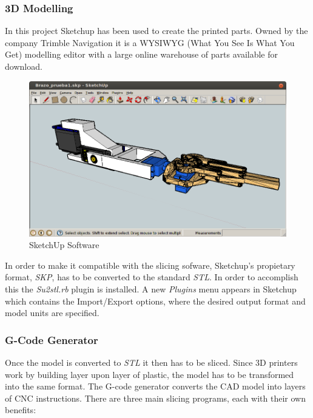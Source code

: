 	\subsubsection{3D Modelling }
	In this project Sketchup has been used to create the printed parts. Owned by the company Trimble Navigation it is a WYSIWYG (What You See Is What You Get) modelling editor with a large online warehouse of parts available for download. \\

		\begin{figure}[H]
			\centering
			\includegraphics[scale=0.4]{images/sketchup-arm.png}
			\caption{SketchUp Software}
			\label{}
		\end{figure}
		\bigskip

	In order to make it compatible with the slicing sofware, Sketchup's propietary format, \textit{SKP}, has to be converted to the standard \textit{STL}. In order to accomplish this the \textit{Su2stl.rb} plugin is installed. A new \textit{Plugins} menu appears in Sketchup which contains the Import/Export options, where the desired output format and model units are specified.



	\subsubsection{G-Code Generator} 
	Once the model is converted to \textit{STL} it then has to be sliced. Since 3D printers work by building layer upon layer of plastic, the model has to be transformed into the same format. The G-code generator converts the CAD model into layers of CNC instructions. There are three main slicing programs, each with their own benefits:


